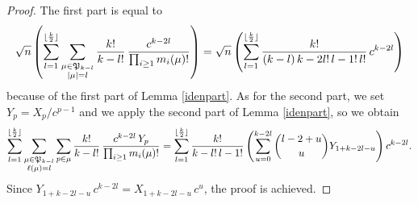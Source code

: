 \documentclass[10pt]{amsart}
\begin{document}
\begin{proof}
The first part is equal to
$$\sqrt{n}\left(\sum_{l=1}^{\lfloor \frac{k}{2}\rfloor}\sum_{\substack{\mu \in \mathfrak{P}_{k-l}\\ |\mu|=l}} \frac{k!}{k-l!}
\,\frac{c^{k-2l }}{\prod_{i \geq 1}m_{i}(\mu)!}\right)=\sqrt{n}\left(\sum_{l=1}^{\lfloor \frac{k}{2}\rfloor} \frac{k!}{(k-l)\,k-2l!\,l-1!\,l!}\,c^{k-2l }\right)$$
because of the first part of Lemma \ref{idenpart}. As for the second part, we set $Y_{p}=X_{p}/c^{p-1}$ and we apply the second part of Lemma \ref{idenpart}, so we obtain
$$\sum_{l=1}^{\lfloor \frac{k}{2}\rfloor} \sum_{\substack{\mu \in \mathfrak{P}_{k-l}\\ \ell(\mu)=l}}\sum_{p \in \mu}\frac{k!}{k-l!}\,\frac{c^{k-2l}\,Y_{p}}{{\prod_{i \geq 1}m_{i}(\mu)!}}=\sum_{l=1}^{\lfloor \frac{k}{2}\rfloor}\frac{k!}{k-l!\,l-1!} \left( \sum_{u=0}^{k-2l} \binom{l-2+u}{u}Y_{1+k-2l-u} \right) c^{k-2l}.$$
Since $Y_{1+k-2l-u}\,c^{k-2l}=X_{1+k-2l-u}\,c^{u}$,  the proof is achieved.
\end{proof}\bigskip
\end{document}
